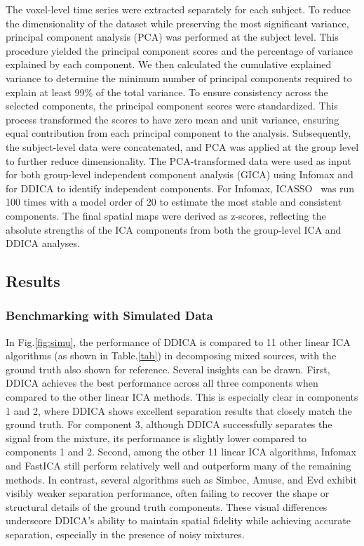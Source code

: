\documentclass{article}
\begin{document}
The voxel-level time series were extracted separately for each subject. To reduce the dimensionality of the dataset while preserving the most significant variance, principal component analysis (PCA) was performed at the subject level. This procedure yielded the principal component scores and the percentage of variance explained by each component. We then calculated the cumulative explained variance to determine the minimum number of principal components required to explain at least 99\% of the total variance. To ensure consistency across the selected components, the principal component scores were standardized. This process transformed the scores to have zero mean and unit variance, ensuring equal contribution from each principal component to the analysis. Subsequently, the subject-level data were concatenated, and PCA was applied at the group level to further reduce dimensionality. The PCA-transformed data were used as input for both group-level independent component analysis (GICA) using Infomax and for DDICA to identify independent components. For Infomax, ICASSO~\cite{himberg2003icasso} was run 100 times with a model order of 20 to estimate the most stable and consistent components. The final spatial maps were derived as z-scores, reflecting the absolute strengths of the ICA components from both the group-level ICA and DDICA analyses.

\subsection{Results}
\subsubsection{Benchmarking with Simulated Data}
\hspace{1.2em} In Fig.\ref{fig:simu}, the performance of DDICA is compared to 11 other linear ICA algorithms (as shown in Table.\ref{tab}) in decomposing mixed sources, with the ground truth also shown for reference. Several insights can be drawn. First, DDICA achieves the best performance across all three components when compared to the other linear ICA methods. This is especially clear in components 1 and 2, where DDICA shows excellent separation results that closely match the ground truth. For component 3, although DDICA successfully separates the signal from the mixture, its performance is slightly lower compared to components 1 and 2. Second, among the other 11 linear ICA algorithms, Infomax and FastICA still perform relatively well and outperform many of the remaining methods. In contrast, several algorithms such as Simbec, Amuse, and Evd exhibit visibly weaker separation performance, often failing to recover the shape or structural details of the ground truth components. These visual differences underscore DDICA's ability to maintain spatial fidelity while achieving accurate separation, especially in the presence of noisy mixtures.
\end{document}
